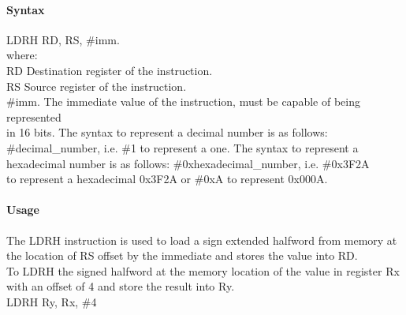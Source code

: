 \documentclass[12pt]{article}
\begin{document}
    \paragraph{Syntax}
    \begin{flushleft}
    LDRH RD, RS, \#imm.\\
    \vspace{1em}        %
    where:\\
    \vspace{1em}
    RD  \hspace{3.6em} Destination register of the instruction.\\
    \vspace{1em}
    RS  \hspace{3.85em} Source register of the instruction.\\
    \vspace{1em}
    \#imm.  \hspace{1.8em} The immediate value of the instruction, must be capable of being represented\\             \hspace{5.4em} in 16 bits. The syntax to represent a decimal number is as follows:\\
            \hspace{5.4em} \#decimal\_number, i.e. \#1 to represent a one. The syntax to represent a\\
            \hspace{5.4em} hexadecimal number is as follows: \#0xhexadecimal\_number, i.e. \#0x3F2A \\
            \hspace{5.4em} to represent a hexadecimal 0x3F2A or \#0xA to represent 0x000A.\\
    \end{flushleft}
    
    \paragraph{Usage}
    \begin{flushleft}
    The LDRH instruction is used to load a sign extended halfword from memory at the location of RS offset by the immediate and stores the value into RD.\\    
    \vspace{1em}
    To LDRH the signed halfword at the memory location of the value in register Rx with an offset of 4 and store the result into Ry.\\
    \vspace{1em}
    LDRH Ry, Rx, \#4
    \end{flushleft}
    
\end{document}
